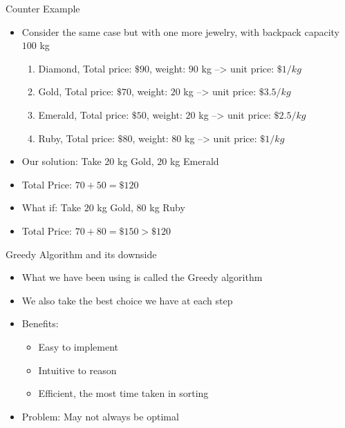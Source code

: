 \documentclass[10pt,xcolor={table,dvipsnames},t]{beamer}
\begin{document}
\begin{frame}{Counter Example}
  \begin{itemize}
    \item Consider the same case but with one more jewelry, with backpack capacity $100$ kg
    \begin{enumerate}
      \item Diamond, Total price: $\$90$, weight: $90$ kg --> unit price: $\$1/kg$
      \item Gold, Total price: $\$70$, weight: $20$ kg --> unit price: $\$3.5/kg$
      \item Emerald, Total price: $\$50$, weight: $20$ kg --> unit price: $\$2.5/kg$
      \item Ruby, Total price: $\$80$, weight: $80$ kg --> unit price: $\$1/kg$
    \end{enumerate}
    \item Our solution: Take $20$ kg Gold, $20$ kg Emerald
    \item Total Price: $70+50=\$120$
    \item What if: Take $20$ kg Gold, $80$ kg Ruby
    \item Total Price: $70+80=\$150>\$120$
  \end{itemize}
\end{frame}

\begin{frame}{Greedy Algorithm and its downside}
  \begin{itemize}
    \item What we have been using is called the Greedy algorithm
    \item We also take the best choice we have at each step
    \item Benefits:
    \begin{itemize}
      \item Easy to implement
      \item Intuitive to reason
      \item Efficient, the most time taken in sorting
    \end{itemize}
    \item Problem: May not always be optimal
  \end{itemize}
\end{frame}
\end{document}
